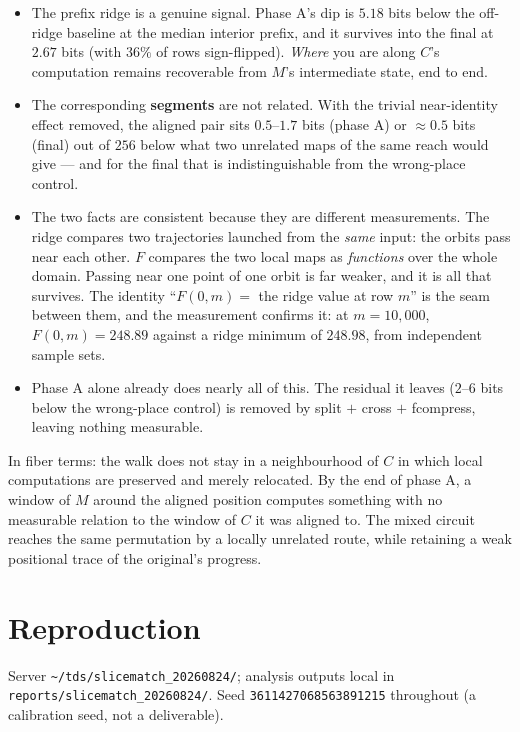 \documentclass[11pt]{article}
\newcommand{\code}[1]{\texttt{#1}}
\begin{document}
\begin{itemize}
\item The prefix ridge is a genuine signal. Phase A's dip is $5.18$ bits below the off-ridge baseline at
the median interior prefix, and it survives into the final at $2.67$ bits (with $36\%$ of rows
sign-flipped). \emph{Where} you are along $C$'s computation remains recoverable from $M$'s intermediate
state, end to end.
\item The corresponding \textbf{segments} are not related. With the trivial near-identity effect
removed, the aligned pair sits $0.5$--$1.7$ bits (phase A) or ${\approx}0.5$ bits (final) out of $256$
below what two unrelated maps of the same reach would give --- and for the final that is
indistinguishable from the wrong-place control.
\item The two facts are consistent because they are different measurements. The ridge compares two
trajectories launched from the \emph{same} input: the orbits pass near each other. $F$ compares the two
local maps as \emph{functions} over the whole domain. Passing near one point of one orbit is far weaker,
and it is all that survives. The identity ``$F(0,m)=$ the ridge value at row $m$'' is the seam between
them, and the measurement confirms it: at $m=10{,}000$, $F(0,m)=248.89$ against a ridge minimum of
$248.98$, from independent sample sets.
\item Phase A alone already does nearly all of this. The residual it leaves ($2$--$6$ bits below the
wrong-place control) is removed by split $+$ cross $+$ fcompress, leaving nothing measurable.
\end{itemize}

In fiber terms: the walk does not stay in a neighbourhood of $C$ in which local computations are
preserved and merely relocated. By the end of phase A, a window of $M$ around the aligned position
computes something with no measurable relation to the window of $C$ it was aligned to. The mixed circuit
reaches the same permutation by a locally unrelated route, while retaining a weak positional trace of the
original's progress.

\section{Reproduction}

Server \code{\textasciitilde/tds/slicematch\_20260824/}; analysis outputs local in
\code{reports/slicematch\_20260824/}. Seed \code{3611427068563891215} throughout (a calibration seed,
not a deliverable).
\end{document}
